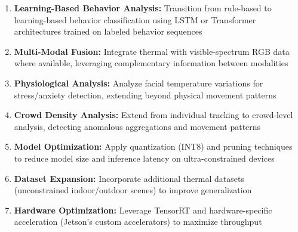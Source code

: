 \documentclass[conference]{IEEEtran}
\begin{document}
\begin{enumerate}
\item \textbf{Learning-Based Behavior Analysis:} Transition from rule-based to learning-based behavior classification using LSTM or Transformer architectures trained on labeled behavior sequences
\item \textbf{Multi-Modal Fusion:} Integrate thermal with visible-spectrum RGB data where available, leveraging complementary information between modalities
\item \textbf{Physiological Analysis:} Analyze facial temperature variations for stress/anxiety detection, extending beyond physical movement patterns
\item \textbf{Crowd Density Analysis:} Extend from individual tracking to crowd-level analysis, detecting anomalous aggregations and movement patterns
\item \textbf{Model Optimization:} Apply quantization (INT8) and pruning techniques to reduce model size and inference latency on ultra-constrained devices
\item \textbf{Dataset Expansion:} Incorporate additional thermal datasets (unconstrained indoor/outdoor scenes) to improve generalization
\item \textbf{Hardware Optimization:} Leverage TensorRT and hardware-specific acceleration (Jetson's custom accelerators) to maximize throughput
\end{enumerate}
\end{document}

